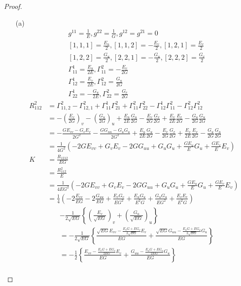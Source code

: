 \documentclass[10pt,a4paper]{article}
\begin{document}
\begin{proof}
\begin{enumerate}
\item[(a)]
\begin{align*}
&g^{11}=\frac{1}{E}, g^{22}=\frac{1}{G}, g^{12}=g^{21}=0\\
&[1,1,1]=\frac{E_u}{2}, [1,1,2]=-\frac{E_v}{2}, [1,2,1]=\frac{E_v}{2}\\
&[1,2,2]=\frac{G_u}{2}, [2,2,1]=-\frac{G_u}{2}, [2,2,2]=\frac{G_v}{2}\\
&\Gamma_{11}^1=\frac{E_u}{2E}, \Gamma_{11}^2=-\frac{E_v}{2G}\\
&\Gamma_{12}^1=\frac{E_v}{2E}, \Gamma_{12}^2=\frac{G_u}{2G}\\
&\Gamma_{22}^1=-\frac{G_u}{2E}, \Gamma_{22}^2=\frac{G_v}{2G}
\end{align*}
\begin{align*}
R_{112}^2&=\Gamma_{11,2}^2-\Gamma_{12,1}^2+\Gamma_{11}^1\Gamma_{21}^2+\Gamma_{11}^2\Gamma_{22}^2-\Gamma_{12}^1\Gamma_{11}^2-\Gamma_{12}^2\Gamma_{12}^2\\
&=-\left(\frac{E_v}{2G}\right)_v-\left(\frac{G_u}{2G}\right)_u+
\frac{E_u}{2E}\frac{G_u}{2G}-\frac{E_v}{2G}\frac{G_v}{2G}+\frac{E_v}{2E}\frac{E_v}{2G}-\frac{G_u}{2G}\frac{G_u}{2G}\\
&=-\frac{GE_{vv}-G_vE_v}{2G^2}-\frac{GG_{uu}-G_uG_u}{2G^2}+
\frac{E_u}{2E}\frac{G_u}{2G}-\frac{E_v}{2G}\frac{G_v}{2G}+\frac{E_v}{2E}\frac{E_v}{2G}-\frac{G_u}{2G}\frac{G_u}{2G}\\
&=\frac{1}{4G^2}\left(-2GE_{vv}+G_vE_v-2GG_{uu}+G_uG_u+\frac{GE_u}{E}G_u+\frac{GE_v}{E}E_v\right)\\
K&=\frac{R_{1212}}{EG}\\
&=\frac{R_{112}^2}{E}\\
&=\frac{1}{4EG^2}\left(-2GE_{vv}+G_vE_v-2GG_{uu}+G_uG_u+\frac{GE_u}{E}G_u+\frac{GE_v}{E}E_v\right)\\
&=\frac{1}{4}\left(-2\frac{E_{vv}}{EG}-2\frac{G_{uu}}{EG}+\frac{E_vG_v}{EG^2}+\frac{E_uG_u}{E^2G}+\frac{G_uG_u}{EG^2}+\frac{E_vE_v}{E^2G}\right)
\end{align*}
\begin{align*}
&-\frac{1}{2\sqrt{EG}}\left\{\left(\frac{E_v}{\sqrt{EG}}\right)_v+\left(\frac{G_u}{\sqrt{EG}}\right)_u\right\}\\
&=-\frac{1}{2\sqrt{EG}}\left\{\frac{\sqrt{EG}E_{vv}-\frac{E_vG+EG_v}{2\sqrt{EG}}E_v}{EG}+\frac{\sqrt{EG}G_{uu}-\frac{E_uG+EG_u}{2\sqrt{EG}}G_u}{EG}\right\}\\
&=-\frac{1}{2}\left\{\frac{E_{vv}-\frac{E_vG+EG_v}{2EG}E_v}{EG}+\frac{G_{uu}-\frac{E_uG+EG_u}{2EG}G_u}{EG}\right\}\\

\end{align*}
\end{enumerate}
\end{proof}
\end{document}
